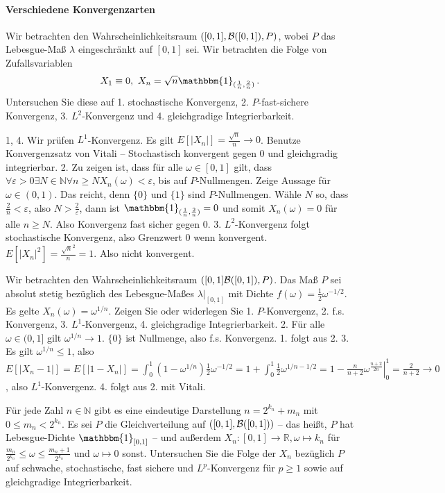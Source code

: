\documentclass{article}
\begin{document}
\paragraph{Verschiedene Konvergenzarten}
Wir betrachten den Wahrscheinlichkeitsraum $([0,1],{\cal B}([0,1]),P)$, wobei $P$ das Lebesgue-Maß $\lambda$ eingeschränkt auf $[0,1]$ sei.
Wir betrachten die Folge von Zufallsvariablen
\[
  X_1\equiv0,~X_n=\sqrt{n}\mathbbm{1}_{(\frac{1}{n},\frac{2}{n})}\,.
\]
Untersuchen Sie diese auf 1. stochastische Konvergenz, 2. $P$-fast-sichere Konvergenz, 3. $L^2$-Konvergenz und 4. gleichgradige  Integrierbarkeit.

1, 4. Wir prüfen $L^1$-Konvergenz.
Es gilt $E[|X_n|]=\frac{\sqrt{n}}{n}\to0$.
Benutze Konvergenzsatz von Vitali -- Stochastisch konvergent gegen 0 und gleichgradig integrierbar.
2. Zu zeigen ist, dass für alle $\omega\in[0,1]$ gilt, dass $\forall\varepsilon>0\exists N\in\mathbb{N}\forall n\geq N X_n(\omega)<\varepsilon$, bis auf $P$-Nullmengen.
Zeige Aussage für $\omega\in(0,1)$.
Das reicht, denn $\{0\}$ und $\{1\}$ sind $P$-Nullmengen.
Wähle $N$ so, dass $\frac{2}{n}<\varepsilon$, also $N>\frac{2}{\varepsilon}$, dann ist $\mathbbm{1}_{(\frac{1}{n},\frac{2}{n})}=0$ und somit $X_n(\omega)=0$ für alle $n\geq N$.
Also Konvergenz fast sicher gegen 0.
3. $L^2$-Konvergenz folgt stochastische Konvergenz, also Grenzwert 0 wenn konvergent.
$E[|X_n|^2]=\frac{\sqrt{n}^2}{n}=1$.
Also nicht konvergent.

Wir betrachten den Wahrscheinlichkeitsraum $([0,1]{\cal B}([0,1]),P)$.
Das Maß $P$ sei absolut stetig bezüglich des Lebesgue-Maßes $\lambda|_{[0,1]}$ mit Dichte $f(\omega)=\frac{1}{2}\omega^{-1/2}$. Es gelte $X_n(\omega)=\omega^{1/n}$.
Zeigen Sie oder widerlegen Sie  1. $P$-Konvergenz, 2. f.s. Konvergenz, 3. $L^1$-Konvergenz, 4. gleichgradige Integrierbarkeit.
2. Für alle $\omega\in(0,1]$ gilt $\omega^{1/n}\to1$.
$\{0\}$ ist Nullmenge, also f.s. Konvergenz.
1. folgt aus 2.
3. Es gilt $\omega^{1/n}\leq1$, also $E[|X_n-1|]=E[|1-X_n|]=\int_0^1(1-\omega^{1/n})\frac{1}{2}\omega^{-1/2}=1+\int_0^1\frac{1}{2}\omega^{1/n-1/2}=1-\left.\frac{n}{n+2}\omega^{\frac{n+2}{2n}}\right|_0^1=\frac{2}{n+2}\to0$, also $L^1$-Konvergenz.
4. folgt aus 2. mit Vitali.

Für jede Zahl $n\in\mathbb{N}$ gibt es eine eindeutige Darstellung $n=2^{k_n}+m_n$ mit $0\leq m_n<2^{k_n}$.
Es sei $P$ die Gleichverteilung auf $([0,1],{\cal B}([0,1]))$ -- das heißt, $P$ hat Lebesgue-Dichte $\mathbbm{1}_{[0,1]}$ -- und außerdem $X_n\colon [0,1]\to\mathbb{R}, \omega\mapsto k_n$ für $\frac{m_n}{2^{k_n}}\leq\omega\leq\frac{m_n+1}{2^{k_n}}$ und $\omega\mapsto 0$ sonst.
Untersuchen Sie die Folge der $X_n$ bezüglich $P$ auf schwache, stochastische, fast sichere und $L^p$-Konvergenz für $p\geq1$ sowie auf gleichgradige Integrierbarkeit.
\end{document}
